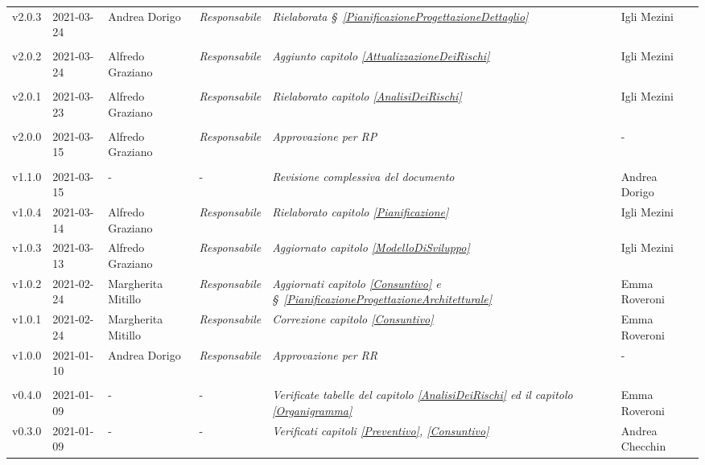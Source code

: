 {\begin{center}
\begin{longtable}[c]{|p{2cm-1\tabcolsep}|p{2cm}|p{3cm-2\tabcolsep}|p{}|p{}|p{4cm-2\tabcolsep}|}
		\centering v2.0.3 & 2021-03-24 & Andrea Dorigo & \centering \textit{Responsabile} & \textit{Rielaborata \S~\ref{PianificazioneProgettazioneDettaglio}  } & \centering Igli Mezini \\ \tabularnewline	
		\hline
		\centering v2.0.2 & 2021-03-24 & Alfredo Graziano & \centering \textit{Responsabile} & \textit{Aggiunto capitolo \ref{AttualizzazioneDeiRischi} } & \centering Igli Mezini \\ \tabularnewline	
		\hline
		\centering v2.0.1 & 2021-03-23 & Alfredo Graziano & \centering \textit{Responsabile} & \textit{Rielaborato capitolo \ref{AnalisiDeiRischi} } & \centering Igli Mezini \\ \tabularnewline
		\hline
		\centering v2.0.0 & 2021-03-15 & Alfredo Graziano & \centering \textit{Responsabile} & \textit{Approvazione per RP} & \centering - \\ \tabularnewline
		\hline
		\centering v1.1.0 & 2021-03-15 & \centering - & \centering - & \textit{Revisione complessiva del documento} & Andrea Dorigo  \\ 
		\hline
		\centering v1.0.4 & 2021-03-14 & Alfredo Graziano & \centering \textit{Responsabile} & \textit{Rielaborato capitolo  \ref{Pianificazione}} & Igli Mezini  \\ 
		\hline
		\centering v1.0.3 & 2021-03-13 & Alfredo Graziano & \centering \textit{Responsabile} & \textit{Aggiornato capitolo \ref{ModelloDiSviluppo}} & Igli Mezini  \\ 
		\hline
		\centering v1.0.2 & 2021-02-24 & Margherita Mitillo & \centering \textit{Responsabile} & \textit{Aggiornati capitolo \ref{Consuntivo} e  \S~\ref{PianificazioneProgettazioneArchitetturale}} & Emma Roveroni  \\ 
		\hline
		\centering v1.0.1 & 2021-02-24 & Margherita Mitillo & \centering \textit{Responsabile} & \textit{Correzione capitolo \ref{Consuntivo}} & Emma Roveroni  \\ 
		\hline
		\centering v1.0.0 & 2021-01-10 & Andrea Dorigo & \centering \textit{Responsabile} & \textit{Approvazione per RR} & \centering -  \\ \tabularnewline
		\hline
		\centering v0.4.0 & 2021-01-09 & \centering - & \centering - & \textit{Verificate tabelle del capitolo \ref{AnalisiDeiRischi} ed il capitolo \ref{Organigramma}} & Emma Roveroni  \\ 
		\hline
		\centering v0.3.0 & 2021-01-09 & \centering - & \centering - & \textit{Verificati capitoli \ref{Preventivo}, \ref{Consuntivo}} & Andrea Checchin \\

\end{longtable}
\end{center}}
